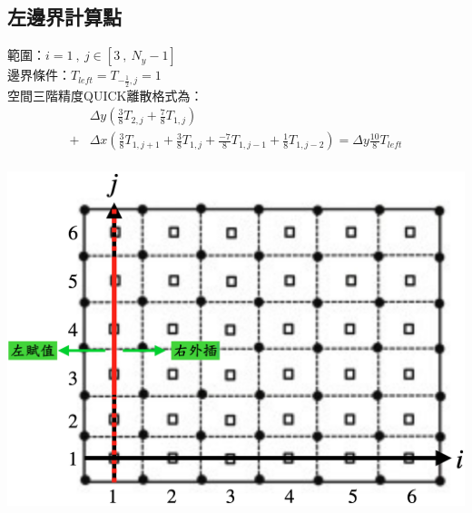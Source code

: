 \documentclass[12pt]{article}
\begin{document}
\subsection{左邊界計算點}
 \begin{minipage}{0.6\textwidth}
   \noindent 範圍：$i=1\ ,\ j\in[3\ ,\ N_{y}-1]$\\[1.5ex]
   \noindent 邊界條件：$T_{left} = T_{-\frac{1}{2},j}= 1$\\[1.5ex]
   \noindent 空間三階精度QUICK離散格式為：
   \begin{equation*}\label{eq:QUICK1}\begin{split}
    &\Delta y(\frac{3}{8}T_{2,j} + \frac{7}{8}T_{1,j})\\[1.5ex]
    +& \Delta x (\frac{3}{8}T_{1,j+1} + \frac{3}{8}T_{1,j} +  \frac{-7}{8}T_{1,j-1}+ \frac{1}{8}T_{1,j-2}) = \Delta y\frac{10}{8}T_{left} \\
   \end{split}\end{equation*}
   \end{minipage}%
   \hfill
   \begin{minipage}{0.34\textwidth}
   \centering
   \includegraphics[width=\linewidth,height=9\baselineskip]{14.png}
   \label{fig:1boundary}
\end{minipage}
\end{document}
